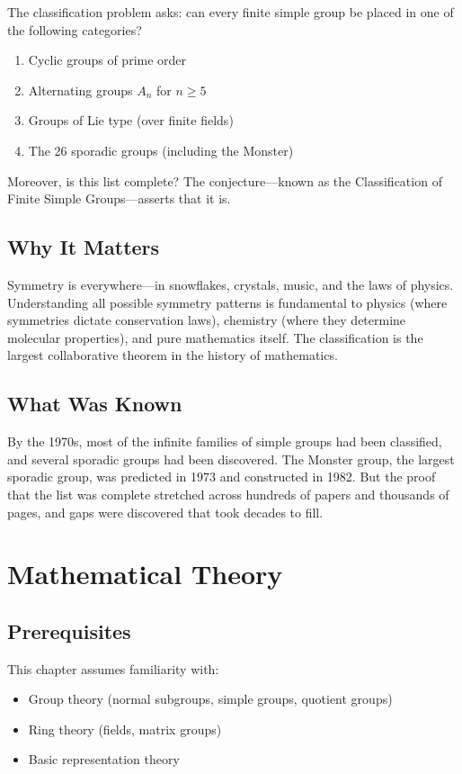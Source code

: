 The classification problem asks: can every finite simple group be placed in one of the following categories?
\begin{enumerate}
\item Cyclic groups of prime order
\item Alternating groups $A_n$ for $n \geq 5$
\item Groups of Lie type (over finite fields)
\item The 26 sporadic groups (including the Monster)
\end{enumerate}
Moreover, is this list complete? The conjecture---known as the Classification of Finite Simple Groups---asserts that it is.

\subsection{Why It Matters}
Symmetry is everywhere---in snowflakes, crystals, music, and the laws of physics. Understanding all possible symmetry patterns is fundamental to physics (where symmetries dictate conservation laws), chemistry (where they determine molecular properties), and pure mathematics itself. The classification is the largest collaborative theorem in the history of mathematics.

\subsection{What Was Known}
By the 1970s, most of the infinite families of simple groups had been classified, and several sporadic groups had been discovered. The Monster group, the largest sporadic group, was predicted in 1973 and constructed in 1982. But the proof that the list was complete stretched across hundreds of papers and thousands of pages, and gaps were discovered that took decades to fill.

\section{Mathematical Theory}


\subsection{Prerequisites}
This chapter assumes familiarity with:
\begin{itemize}
\item Group theory (normal subgroups, simple groups, quotient groups)
\item Ring theory (fields, matrix groups)
\item Basic representation theory
\end{itemize}

